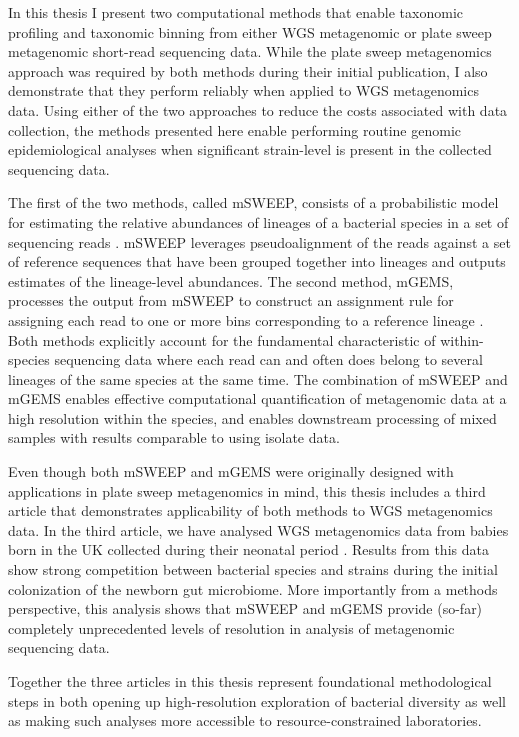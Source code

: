 \documentclass[officiallayout]{tktla}
\begin{document}
In this thesis I present two computational methods that enable
taxonomic profiling and taxonomic binning from either WGS metagenomic
or plate sweep metagenomic short-read sequencing data. While the plate
sweep metagenomics approach was required by both methods during their
initial publication, I also demonstrate that they perform reliably
when applied to WGS metagenomics data. Using either of the two
approaches to reduce the costs associated with data collection, the
methods presented here enable performing routine genomic
epidemiological analyses when significant strain-level is present in
the collected sequencing data.

The first of the two methods, called mSWEEP, consists of a
probabilistic model for estimating the relative abundances of lineages
of a bacterial species in a set of sequencing reads
\citep{maklin_high-resolution_2021}. mSWEEP leverages pseudoalignment
\citep{bray2016near} of the reads against a set of reference sequences
that have been grouped together into lineages and outputs estimates of
the lineage-level abundances. The second method, mGEMS, processes the
output from mSWEEP to construct an assignment rule for assigning each
read to one or more bins corresponding to a reference lineage
\citep{maklin_bacterial_2021}. Both methods explicitly account for the
fundamental characteristic of within-species sequencing data where
each read can and often does belong to several lineages of the same
species at the same time. The combination of mSWEEP and mGEMS enables
effective computational quantification of metagenomic data at a high
resolution within the species, and enables downstream processing of
mixed samples with results comparable to using isolate data.

Even though both mSWEEP and mGEMS were originally designed with
applications in plate sweep metagenomics in mind, this thesis includes
a third article \citep{maklin_strong_2022} that demonstrates
applicability of both methods to WGS metagenomics data. In the third
article, we have analysed WGS metagenomics data from babies born in
the UK collected during their neonatal period
\citep{shao2019stunted}. Results from this data show strong
competition between bacterial species and strains during the initial
colonization of the newborn gut microbiome. More importantly from a
methods perspective, this analysis shows that mSWEEP and mGEMS provide
(so-far) completely unprecedented levels of resolution in analysis of
metagenomic sequencing data.

Together the three articles in this thesis represent foundational
methodological steps in both opening up high-resolution exploration of
bacterial diversity as well as making such analyses more accessible to
resource-constrained laboratories.
\end{document}
